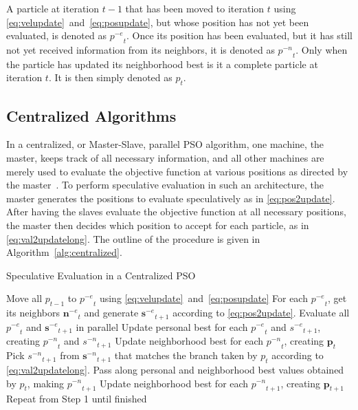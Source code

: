 \documentclass[journal,letterpaper]{IEEEtran}
\newcommand{\alg}[1]{Algorithm~\ref{alg:#1}}
\providecommand{\noeval}[1]{\ensuremath{#1^{-e}}}
\providecommand{\nonbest}[1]{\ensuremath{#1^{-n}}}
\providecommand{\p}{\ensuremath{p}}
\providecommand{\pset}{\ensuremath{\mathbf{p}}}
\providecommand{\s}{\ensuremath{s}}
\providecommand{\sset}{\ensuremath{\mathbf{s}}}
\providecommand{\nset}{\ensuremath{\mathbf{n}}}
\begin{document}
A particle at iteration $t-1$ that has been moved to iteration $t$ using
\eqref{eq:velupdate}~and~\eqref{eq:posupdate}, but whose position has
not yet been evaluated, is denoted as $\noeval{\p}_t$.  Once its position has
been evaluated, but it has still not yet received information from its
neighbors, it is denoted as $\nonbest{\p}_t$.  Only when the particle has
updated its neighborhood best is it a complete particle at iteration $t$.  It
is then simply denoted as $\p_t$.

\subsection{Centralized Algorithms}

In a centralized, or Master-Slave, parallel PSO algorithm, one machine, the
master, keeps track of all necessary information, and all other machines are
merely used to evaluate the objective function at various positions as directed
by the master~\cite{belal-2004-parallel-models-for-pso}.  To perform
speculative evaluation in such an architecture, the master generates the
positions to evaluate speculatively as in \eqref{eq:pos2update}.  After having
the slaves evaluate the objective function at all necessary positions, the
master then decides which position to accept for each particle, as in
\eqref{eq:val2updatelong}.  The outline of the procedure is given in
\alg{centralized}.

\begin{algorithm}
  \caption{Speculative Evaluation in a Centralized PSO}
  \label{alg:centralized}
  \begin{algorithmic}[1]
	\STATE Move all $\p_{t-1}$ to $\noeval{\p}_t$ using
	  \eqref{eq:velupdate}~and~\eqref{eq:posupdate}
	\STATE For each $\noeval{\p}_t$, get its neighbors $\noeval{\nset}_t$ and
	  generate $\noeval{\sset}_{t+1}$ according to
	  \eqref{eq:pos2update}.
	\STATE Evaluate all $\noeval{\p}_t$ and $\noeval{\sset}_{t+1}$ in parallel
	\STATE Update personal best for each $\noeval{\p}_t$ and
	  $\noeval{\s}_{t+1}$, creating $\nonbest{\p}_t$ and $\nonbest{\s}_{t+1}$
	\STATE Update neighborhood best for each $\nonbest{\p}_t$, creating
	  $\pset_t$
	\FORALL{$\p_t$}
	\STATE Pick $\nonbest{\s}_{t+1}$ from $\nonbest{\sset}_{t+1}$ that matches
	  the branch taken by $\p_t$ according to
	  \eqref{eq:val2updatelong}.
	\STATE Pass along personal and neighborhood best values obtained by $\p_t$,
	  making $\nonbest{\p}_{t+1}$
	\ENDFOR
	\STATE Update neighborhood best for each $\nonbest{\p}_{t+1}$, creating
	  $\pset_{t+1}$
	\STATE Repeat from Step 1 until finished
  \end{algorithmic}
\end{algorithm}
\end{document}
